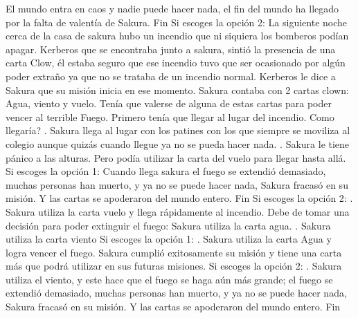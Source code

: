 \documentclass[12pt]{report}
\begin{document}
\newline
El mundo entra en caos y nadie puede hacer nada, el fin del mundo ha llegado por la falta de valentía de Sakura. Fin
\newline
\newline
Si escoges la opción 2:
\newline
\newline
La siguiente noche cerca de la casa de sakura hubo un incendio que ni siquiera los bomberos podían apagar. Kerberos que se encontraba junto a sakura, sintió la presencia de una carta Clow, él estaba seguro que ese incendio tuvo que ser ocasionado por algún poder extraño ya que no se trataba de un incendio normal.
Kerberos le dice a Sakura que su misión inicia en ese momento. Sakura contaba con 2 cartas clown: Agua, viento y vuelo.
Tenía que valerse de alguna de estas cartas para poder vencer al terrible Fuego.
Primero tenía que llegar al lugar del incendio. Como llegaría?
\newline
{}.	Sakura llega al lugar con los patines con los que siempre se moviliza al colegio aunque  quizás cuando llegue ya no se pueda hacer nada.
\newline
{}.	Sakura le tiene pánico a las alturas. Pero podía utilizar la carta del vuelo para llegar hasta allá.
\newline
\newline
Si escoges la opción 1:
\newline
\newline
Cuando llega sakura el fuego se extendió demasiado, muchas personas han muerto, y ya no se puede hacer nada, Sakura fracasó en su misión. Y las cartas se apoderaron del mundo entero. Fin
\newline
\newline
Si escoges la opción 2:
\newline
{}.	Sakura utiliza la carta vuelo y llega rápidamente al incendio. Debe de tomar una decisión para poder extinguir el fuego:
	Sakura utiliza la carta agua.
.	Sakura utiliza la carta viento
\newline
\newline
Si escoges la opción 1:
\newline
{}.	Sakura utiliza la carta Agua y logra vencer el fuego. Sakura cumplió exitosamente su misión y tiene una carta más que podrá utilizar en sus futuras misiones.
\newline
\newline
Si escoges la opción 2:
\newline
{}.	Sakura utiliza el viento, y este hace que el fuego se haga aún más grande; el fuego se extendió demasiado, muchas personas han muerto, y ya no se puede hacer nada, Sakura fracasó en su misión. Y las cartas se apoderaron del mundo entero. Fin
\end{document}
